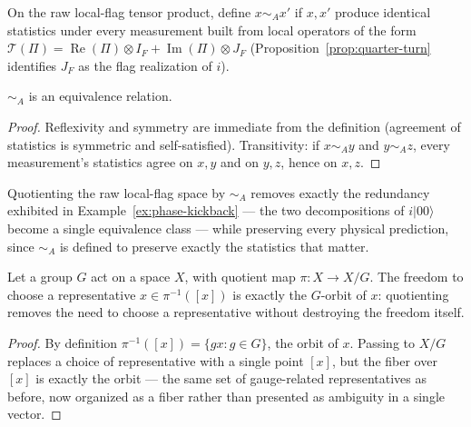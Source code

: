 \begin{definition}
\label{def:admissibility-equiv}
On the raw local-flag tensor product, define $x\sim_A x'$ if $x,x'$ produce
identical statistics under every measurement built from local operators of
the form $\mathcal T(\Pi) = \operatorname{Re}(\Pi)\otimes I_F +
\operatorname{Im}(\Pi)\otimes J_F$ (Proposition~\ref{prop:quarter-turn}
identifies $J_F$ as the flag realization of $i$).
\end{definition}

\begin{proposition}
\label{prop:equiv-relation}
$\sim_A$ is an equivalence relation.
\end{proposition}

\begin{proof}
Reflexivity and symmetry are immediate from the definition (agreement of
statistics is symmetric and self-satisfied). Transitivity: if $x\sim_A y$
and $y\sim_A z$, every measurement's statistics agree on $x,y$ and on
$y,z$, hence on $x,z$.
\end{proof}

Quotienting the raw local-flag space by $\sim_A$ removes exactly the
redundancy exhibited in Example~\ref{ex:phase-kickback} — the two
decompositions of $i|00\rangle$ become a single equivalence class — while
preserving every physical prediction, since $\sim_A$ is defined to
preserve exactly the statistics that matter.

\begin{proposition}
\label{prop:ambiguity-conservation}
Let a group $G$ act on a space $X$, with quotient map $\pi:X\to X/G$. The
freedom to choose a representative $x\in\pi^{-1}([x])$ is exactly the
$G$-orbit of $x$: quotienting removes the need to choose a representative
without destroying the freedom itself.
\end{proposition}

\begin{proof}
By definition $\pi^{-1}([x]) = \{gx : g\in G\}$, the orbit of $x$. Passing
to $X/G$ replaces a choice of representative with a single point $[x]$, but
the fiber over $[x]$ is exactly the orbit — the same set of gauge-related
representatives as before, now organized as a fiber rather than presented
as ambiguity in a single vector.
\end{proof}

